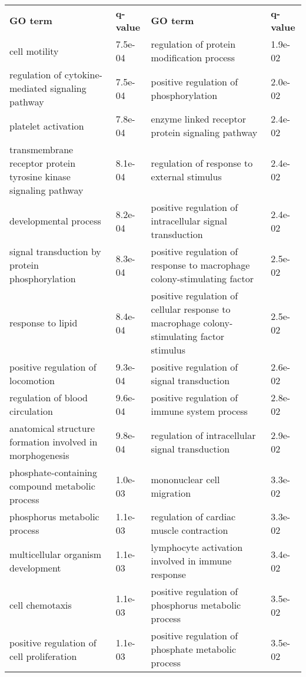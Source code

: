 \documentclass[fleqn,10pt]{SelfArx} %
\begin{document}
\begin{table}[!htb]
	\centering
	\scriptsize
	\begin{tabularx}{\textwidth}{XlXl}
		\rowcolor{NavyBlue!80}
		\textbf{\color{white} GO term} & \textbf{\color{white} q-value} & \textbf{\color{white} GO term} & \textbf{\color{white} q-value} \\
		cell motility & 7.5e-04 & regulation of protein modification process & 1.9e-02 \\ 
		regulation of cytokine-mediated signaling pathway & 7.5e-04 & positive regulation of phosphorylation & 2.0e-02 \\ 
		platelet activation & 7.8e-04 & enzyme linked receptor protein signaling pathway & 2.4e-02 \\ 
		transmembrane receptor protein tyrosine kinase signaling pathway & 8.1e-04 & regulation of response to external stimulus & 2.4e-02 \\ 
		developmental process & 8.2e-04 & positive regulation of intracellular signal transduction & 2.4e-02 \\ 
		signal transduction by protein phosphorylation & 8.3e-04 & positive regulation of response to macrophage colony-stimulating factor & 2.5e-02 \\ 
		response to lipid & 8.4e-04 & positive regulation of cellular response to macrophage colony-stimulating factor stimulus & 2.5e-02 \\ 
		positive regulation of locomotion & 9.3e-04 & positive regulation of signal transduction & 2.6e-02 \\ 
		regulation of blood circulation & 9.6e-04 & positive regulation of immune system process & 2.8e-02 \\ 
		anatomical structure formation involved in morphogenesis & 9.8e-04 & regulation of intracellular signal transduction & 2.9e-02 \\ 
		phosphate-containing compound metabolic process & 1.0e-03 & mononuclear cell migration & 3.3e-02 \\ 
		phosphorus metabolic process & 1.1e-03 & regulation of cardiac muscle contraction & 3.3e-02 \\ 
		multicellular organism development & 1.1e-03 & lymphocyte activation involved in immune response & 3.4e-02 \\ 
		cell chemotaxis & 1.1e-03 & positive regulation of phosphorus metabolic process & 3.5e-02 \\ 
		positive regulation of cell proliferation & 1.1e-03 & positive regulation of phosphate metabolic process & 3.5e-02 \\ 

\end{tabularx}
\end{table}
\end{document}
